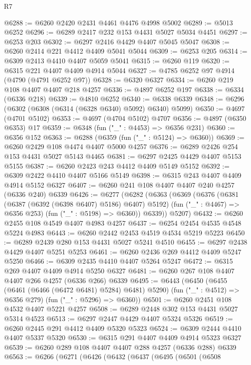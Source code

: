 \begin{lexlean}{R7}
\begin{coremodule}
@6288 := @6260 @2420 @2431 @4461 @4476 @4998 @5002
@6289 := @5013 @6252
@6296 := @6289 @2417 @232 @153 @4431 @5027 @5034 @4451
@6297 := @6253 @203
@6302 := @6297 @2416 @4429 @4407 @5045 @5047
@6308 := @6260 @2414 @221 @4412 @4409 @5041 @5044
@6309 := @6253 @205
@6314 := @6309 @2413 @4410 @4407 @5059 @5041
@6315 := @6260 @119
@6320 := @6315 @221 @4407 @4409 @4914 @5044
@6327 := @4785 @6252 @97 @4914 (@4790 (@4791 @6252 @97))
@6328 := @6320 @6327
@6334 := @6260 @219 @108 @4407 @4407 @218 @4257
@6336 := @4897 @6252 @197
@6338 := @6334 (@6336 @218)
@6339 := @4810 @6252
@6340 := @6338 @6339
@6348 := @6296 (@6302 (@6308 (@6314 (@6328 @6340) @5092) @6340) @5099)
@6350 := @4697 (@4701 @5102)
@6353 := @4697 (@4704 @5102) @4707
@6356 := @4897 (@6350 @6353) @17
@6359 := @6348 (fun ("_" : @4453) => @6356 @231)
@6360 := @6356 @152
@6363 := @6288 (@6359 (fun ("_" : @5124) => @6360))
@6369 := @6260 @2429 @108 @4474 @4407 @5000 @4257
@6376 := @6289 @2426 @254 @153 @4431 @5027 @5143 @4465
@6381 := @6297 @2425 @4429 @4407 @5153 @5155
@6387 := @6260 @2423 @243 @4412 @4409 @5149 @5152
@6392 := @6309 @2422 @4410 @4407 @5166 @5149
@6398 := @6315 @243 @4407 @4409 @4914 @5152 @6327
@6407 := @6260 @241 @108 @4407 @4407 @240 @4257 (@6336 @240) @6339
@6426 := @6277
    (@6282
      (@6363
        (@6369
          (@6376
            (@6381 (@6387 (@6392 (@6398 @6407) @5186) @6407) @5192)
            (fun ("_" : @4467) => @6356 @253)
            (fun ("_" : @5198) => @6360))
          @6339))
      @5207)
@6432 := @6260 @2455 @108 @4549 @4407 @4983 @4257
@6437 := @6254 @2454 @4535 @4548 @5224 @4983
@6443 := @6260 @2442 @2453 @4519 @4534 @5219 @5223
@6450 := @6289 @2439 @280 @153 @4431 @5027 @5241 @4510
@6455 := @6297 @2438 @4429 @4407 @5251 @5253
@6461 := @6260 @2436 @269 @4412 @4409 @5247 @5250
@6466 := @6309 @2435 @4410 @4407 @5264 @5247
@6472 := @6315 @269 @4407 @4409 @4914 @5250 @6327
@6481 := @6260 @267 @108 @4407 @4407 @266 @4257 (@6336 @266) @6339
@6495 := @6443
    (@6450
      (@6455 (@6461 (@6466 (@6472 @6481) @5284) @6481) @5290)
      (fun ("_" : @4512) => @6356 @279)
      (fun ("_" : @5296) => @6360))
@6501 := @6260 @2451 @108 @4532 @4407 @5221 @4257
@6508 := @6289 @2448 @302 @153 @4431 @5027 @5314 @4523
@6513 := @6297 @2447 @4429 @4407 @5324 @5326
@6519 := @6260 @2445 @291 @4412 @4409 @5320 @5323
@6524 := @6309 @2444 @4410 @4407 @5337 @5320
@6530 := @6315 @291 @4407 @4409 @4914 @5323 @6327
@6539 := @6260 @289 @108 @4407 @4407 @288 @4257 (@6336 @288) @6339
@6563 := @6266
    (@6271
      (@6426
        (@6432
          (@6437
            (@6495
              (@6501
                (@6508

\end{coremodule}
\end{lexlean}
